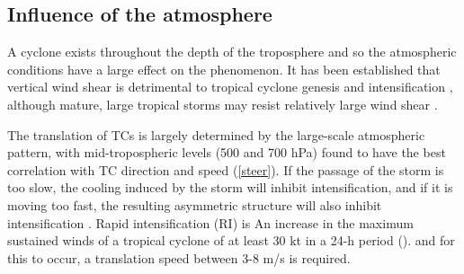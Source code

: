 



\subsection{Influence of the atmosphere}
A cyclone exists throughout the depth of the troposphere and so the atmospheric conditions have a large effect on the phenomenon. It has been established that vertical wind shear is detrimental to tropical cyclone genesis and intensification \citep[e.g.][]{chan1982tropical, McBride1995}, although mature, large tropical storms may resist relatively large wind shear \citep{zeng2007environmental}.


The translation of TCs is largely determined by the large-scale atmospheric pattern, with mid-tropospheric levels (500 and 700 hPa) found to have the best correlation with TC direction and speed \citep{chan1982tropical} (\ref{steer}). If the passage of the storm is too slow, the cooling induced by the storm will inhibit intensification, and if it is moving too fast, the resulting asymmetric structure will also inhibit intensification \citep{zeng2007environmental}. Rapid intensification (RI) is An increase in the maximum sustained winds of a tropical cyclone of at least 30 kt in a 24-h period (\citep{nhc_gloss}). and for this to occur, a translation speed between 3-8 m/s is required. %

